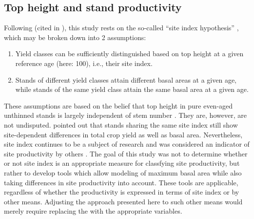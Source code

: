 \subsection{Top height and stand productivity}

Following \textcite{Baur1881} (cited in \textcite[p. 159]{Assmann1970}), this study rests on the so-called ``site index hypothesis'' \parencite{Skovsgaard2008}, which may be broken down into 2 assumptions:
\begin{enumerate}
\item Yield classes can be sufficiently distinguished based on top height at a given reference age (here: \SI{100}{\year}), i.e., their site index.
\item Stands of different yield classes attain different basal areas at a given age, while stands of the same yield class attain the same basal area at a given age.
\end{enumerate}
These assumptions are based on the belief that top height in pure even-aged unthinned stands is largely independent of stem number \parencite{Skovsgaard2008}.  
They are, however, are not undisputed.  \textcite{Assmann1970} pointed out that stands sharing the same site index still show site-dependent differences in total crop yield as well as basal area.  Nevertheless, site index continues to be a subject of research \parencite{Weiskittel2011,Somarriba2001,Wang2005} and was considered an indicator of site productivity by others \parencite{Monserud1984,Rayner1992,Karlsson1997}.  The goal of this study was not to determine whether or not site index is an appropriate measure for classfying site productivity, but rather to develop tools which allow modeling of maximum basal area while also taking differences in site productivity into account.  These tools are applicable, regardless of whether the productivity is expressed in terms of site index or by other means.  Adjusting the approach presented here to such other means would merely require replacing the \ProductivityIndexVariableText{} with the appropriate variables.

